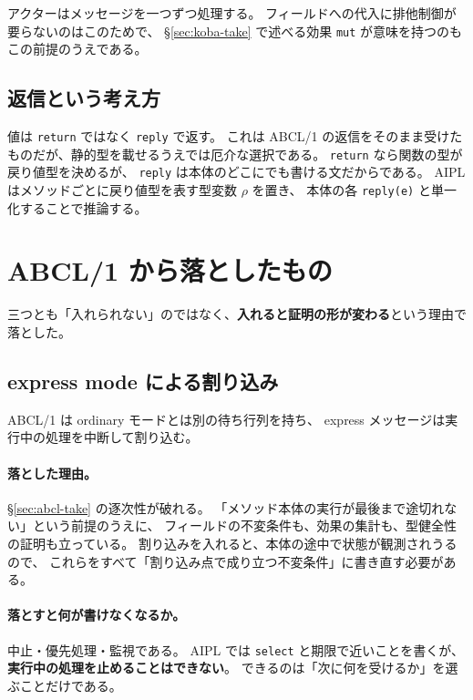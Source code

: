 \documentclass[11pt,a4paper]{ltjsarticle}
\theoremstyle{definition}
\theoremstyle{remark}
\begin{document}
アクターはメッセージを一つずつ処理する。
フィールドへの代入に排他制御が要らないのはこのためで、
\S\ref{sec:koba-take} で述べる効果 \texttt{mut} が意味を持つのもこの前提のうえである。

\subsection{返信という考え方}

値は \texttt{return} ではなく \texttt{reply} で返す。
これは ABCL/1 の返信をそのまま受けたものだが、静的型を載せるうえでは厄介な選択である。
\texttt{return} なら関数の型が戻り値型を決めるが、
\texttt{reply} は本体のどこにでも書ける文だからである。
AIPL はメソッドごとに戻り値型を表す型変数 $\rho$ を置き、
本体の各 \texttt{reply(e)} と単一化することで推論する。

\section{ABCL/1 から落としたもの}
\label{sec:abcl-drop}

三つとも「入れられない」のではなく、\textbf{入れると証明の形が変わる}という理由で落とした。

\subsection{express mode による割り込み}

ABCL/1 は ordinary モードとは別の待ち行列を持ち、
express メッセージは実行中の処理を中断して割り込む。

\paragraph{落とした理由。}
\S\ref{sec:abcl-take} の逐次性が破れる。
「メソッド本体の実行が最後まで途切れない」という前提のうえに、
フィールドの不変条件も、効果の集計も、型健全性の証明も立っている。
割り込みを入れると、本体の途中で状態が観測されうるので、
これらをすべて「割り込み点で成り立つ不変条件」に書き直す必要がある。

\paragraph{落とすと何が書けなくなるか。}
中止・優先処理・監視である。
AIPL では \texttt{select} と期限で近いことを書くが、
\textbf{実行中の処理を止めることはできない}。
できるのは「次に何を受けるか」を選ぶことだけである。
\end{document}
